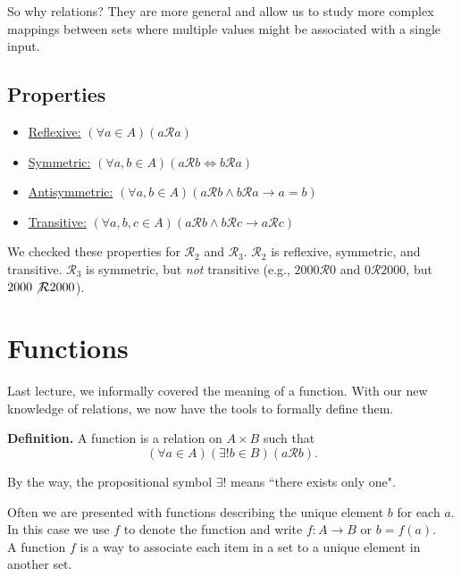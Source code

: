 \documentclass{article}
\begin{document}
    So why relations? They are more general and allow us to study more complex mappings between sets where multiple values might be associated with a single input. \\
    
\subsection*{Properties}
    
    \begin{itemize}
        \item \underline{Reflexive:} $(\forall a \in A)(a\mathcal{R}a)$
        \item \underline{Symmetric:} $(\forall a, b \in A)(a\mathcal{R}b \iff b\mathcal{R}a)$
        \item \underline{Antisymmetric:} $(\forall a, b\in A)(a\mathcal{R}b \wedge b\mathcal{R}a \rightarrow a=b)$
        \item \underline{Transitive:} $(\forall a, b, c\in A)(a\mathcal{R}b \wedge b\mathcal{R}c \rightarrow a\mathcal{R}c)$
    \end{itemize}
    
    We checked these properties for $\mathcal{R}_{2}$ and $\mathcal{R}_{3}$. $\mathcal{R}_{2}$ is reflexive, symmetric, and transitive. $\mathcal{R}_{3}$ is symmetric, but \textit{not} transitive (e.g., $2000 \mathcal{R} 0$ and $0 \mathcal{R} 2000$, but $2000 \not\mathcal{R} 2000$).
    
\section*{Functions}
    Last lecture, we informally covered the meaning of a function. With our new knowledge of relations, we now have the tools to formally define them.
    
    \vspace{1.5mm}
    \textbf{Definition.}
    A function is a relation on $A\times B$ such that 
    $$(\forall a \in A)(\exists! b \in B)(a\mathcal{R}b).$$
    
    By the way, the propositional symbol $\exists!$ means ``there exists only one".
    
    Often we are presented with functions describing the unique element $b$ for each $a$. In this case we use $f$ to denote the function and write $f: A \rightarrow B$ or $b=f(a)$. \\
    
    A function $f$ is a way to associate each item in a set to a unique element in another set. \\
    
\end{document}
